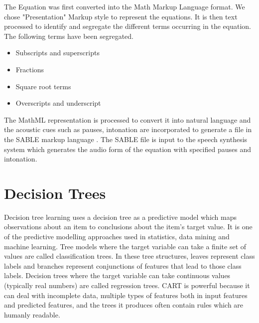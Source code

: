 \documentclass{article}
\begin{document}
The Equation was first converted into the Math Markup Language format. We chose "Presentation" Markup style to represent the equations.  
It is then text processed to identify and segregate the different terms occurring in the equation. The following terms have been segregated.

\begin{itemize}
\item Subscripts and superscripts 
\item Fractions
\item Square root terms
\item Overscripts and underscript
\end{itemize}

The MathML representation is processed to convert it into natural language and the acoustic cues such as pauses, intonation are incorporated to generate a file in the SABLE markup language \cite{sproat1998sable}. 
The SABLE file is input to the speech synthesis system which generates the audio form of the equation with specified pauses and intonation.







\section { Decision Trees }
\label{sec:decision trees}
Decision tree learning uses a decision tree as a predictive model which maps observations about an item to conclusions about the item's target value. It is one of the predictive modelling approaches used in statistics, data mining and machine learning. Tree models where the target variable can take a finite set of values are called classification trees. In these tree structures, leaves represent class labels and branches represent conjunctions of features that lead to those class labels. Decision trees where the target variable can take continuous values (typically real numbers) are called regression trees. CART is powerful because it can deal with incomplete data, multiple types of features  both in input features and predicted features, and the trees it produces often contain rules which are humanly readable.
\end{document}
